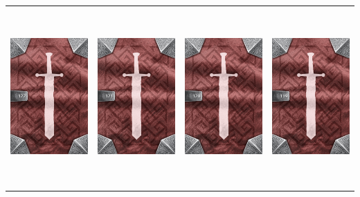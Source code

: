 \documentclass{minimal}
\begin{document}
{\begin{longtable}{llll}
\includegraphics[width=44mm,height=68mm]{./64-151/gh-122-orb-of-twilight-back.png} &
\includegraphics[width=44mm,height=68mm]{./64-151/gh-121-orb-of-dawn-back.png} &
\includegraphics[width=44mm,height=68mm]{./64-151/gh-120-staff-of-summoning-back.png} &
\includegraphics[width=44mm,height=68mm]{./64-151/gh-119-skull-of-hatred-back.png}\\ 

\end{longtable}}
\end{document}
